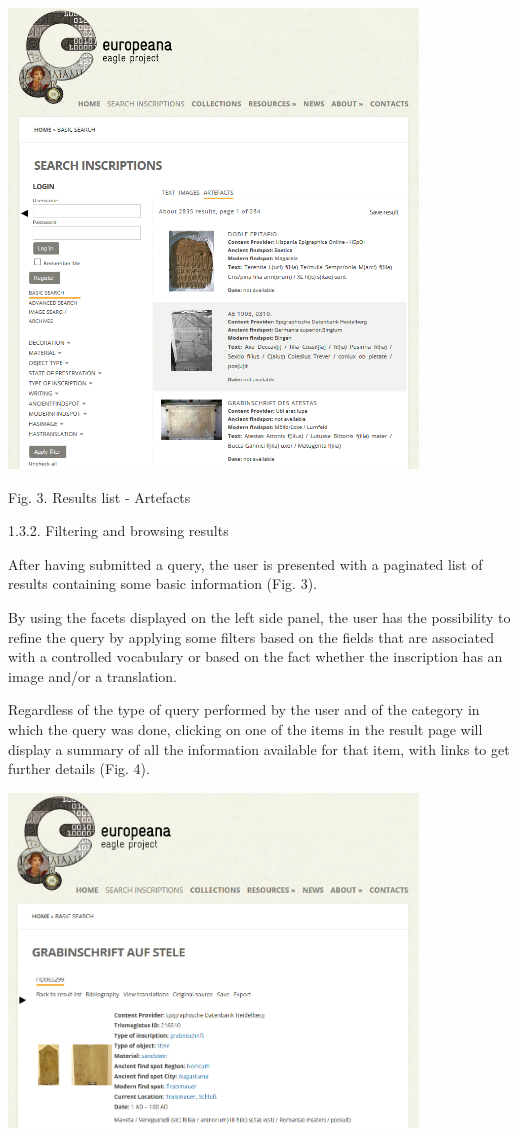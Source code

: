  \includegraphics[width=10.874cm,height=12.197cm]{EAGLE2016submissionXX-img003.png} 

Fig. 3. Results list - Artefacts


\bigskip

1.3.2. Filtering and browsing results


\bigskip

After having submitted a query, the user is presented with a paginated list of results containing some basic information
(Fig. 3). 

By using the facets displayed on the left side panel, the user has the possibility to refine the query by applying some
filters based on the fields that are associated with a controlled vocabulary or based on the fact whether the
inscription has an image and/or a translation.

Regardless of the type of query performed by the user and of the category in which the query was done, clicking on one
of the items in the result page will display a summary of all the information available for that item, with links to
get further details (Fig. 4).


\bigskip

 \includegraphics[width=10.874cm,height=8.864cm]{EAGLE2016submissionXX-img004.png} 

